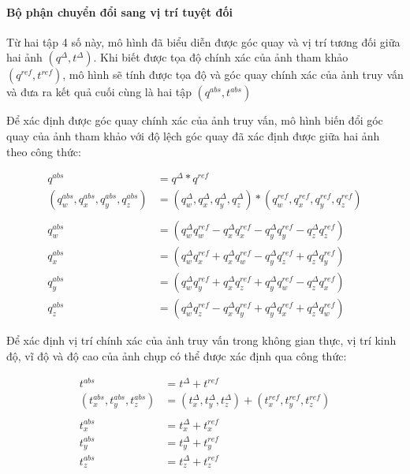 \paragraph*{Bộ phận chuyển đổi sang vị trí tuyệt đối}

Từ hai tập 4 số này, mô hình đã biểu diễn được góc quay và vị trí tương đối giữa hai ảnh $(q^{\Delta},t^{\Delta})$. Khi biết được tọa độ chính xác của ảnh tham khảo $(q^{ref},t^{ref})$, mô hình sẽ tính được tọa độ và góc quay chính xác của ảnh truy vấn và đưa ra kết quả cuối cùng là hai tập $(q^{abs},t^{abs})$

Để xác định được góc quay chính xác của ảnh truy vấn, mô hình biến đổi góc quay của ảnh tham khảo với độ lệch góc quay đã xác định được giữa hai ảnh theo công thức:

$$
\begin{aligned}
    q^{abs} &= q^{\Delta} * q^{ref} \\
    (q^{abs}_w,q^{abs}_x,q^{abs}_y,q^{abs}_z) &= (q^{\Delta}_w,q^{\Delta}_x,q^{\Delta}_y,q^{\Delta}_z) * (q^{ref}_w,q^{ref}_x,q^{ref}_y,q^{ref}_z) \\ \\
    q^{abs}_w &=\left(q^{\Delta}_w q^{ref}_w-q^{\Delta}_x q^{ref}_x-q^{\Delta}_y q^{ref}_y-q^{\Delta}_z q^{ref}_z\right) \\
    q^{abs}_x &=\left(q^{\Delta}_w q^{ref}_x+q^{\Delta}_x q^{ref}_w-q^{\Delta}_y q^{ref}_z+q^{\Delta}_z q^{ref}_y\right) \\
    q^{abs}_y &=\left(q^{\Delta}_w q^{ref}_y+q^{\Delta}_x q^{ref}_z+q^{\Delta}_y q^{ref}_w-q^{\Delta}_z q^{ref}_x\right) \\
    q^{abs}_z &=\left(q^{\Delta}_w q^{ref}_z-q^{\Delta}_x q^{ref}_y+q^{\Delta}_y q^{ref}_x+q^{\Delta}_z q^{ref}_w\right)
\end{aligned}
$$

Để xác định vị trí chính xác của ảnh truy vấn trong không gian thực, vị trí kinh độ, vĩ độ và độ cao của ảnh chụp có thể được xác định qua công thức:

$$
\begin{aligned}
    t^{abs} &= t^{\Delta} + t^{ref} \\
    (t^{abs}_x,t^{abs}_y,t^{abs}_z) &= (t^{\Delta}_x,t^{\Delta}_y,t^{\Delta}_z) + (t^{ref}_x,t^{ref}_y,t^{ref}_z) \\ \\
    t^{abs}_x &= t^{\Delta}_x + t^{ref}_x \\
    t^{abs}_y &= t^{\Delta}_y + t^{ref}_y \\
    t^{abs}_z &= t^{\Delta}_z + t^{ref}_z \\
\end{aligned}
$$

